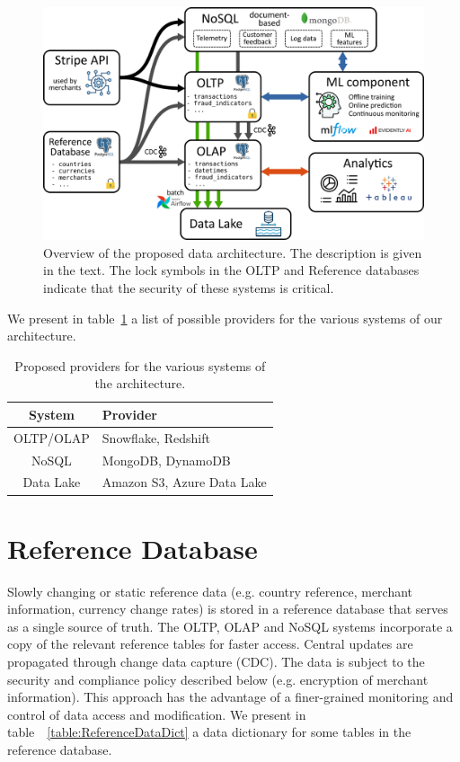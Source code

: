 \documentclass[11pt,a4paper,computermodern]{article}
\begin{document}
\begin{figure}[h]
	\centering
	\includegraphics[scale=0.93]{./figures/architecture}
	\caption{Overview of the proposed data architecture. The description is given in the text. The lock symbols in the OLTP and Reference databases indicate that the security of these systems is critical.}
	\label{fig:architecture}
\end{figure}


We present in table~\ref{table:providers} a list of possible providers for the various systems of our architecture.

\begin{table}[ht]
	\centering
	\begin{threeparttable}
		\caption{Proposed providers for the various systems of the architecture.}
		\label{table:providers}
		\begin{tabularx}{0.99\textwidth}{c >{\centering\arraybackslash}X}
			\toprule
			System & Provider  \\
			\midrule
			OLTP/OLAP & Snowflake, Redshift \\
			NoSQL & MongoDB, DynamoDB \\
			Data Lake & Amazon S3, Azure Data Lake \\
			\bottomrule
		\end{tabularx}
	\end{threeparttable}
\end{table}

\section*{Reference Database}

Slowly changing or static reference data (e.g. country reference, merchant information, currency change rates) is stored in a reference database that serves as a single source of truth. The OLTP, OLAP and NoSQL systems incorporate a copy of the relevant reference tables for faster access. Central updates are propagated through change data capture (CDC). The data is subject to the security and compliance policy described below (e.g. encryption of merchant information). This approach has the advantage of a finer-grained monitoring and control of data access and modification. We present in table~~\ref{table:ReferenceDataDict} a data dictionary for some tables in the reference database.
\end{document}
